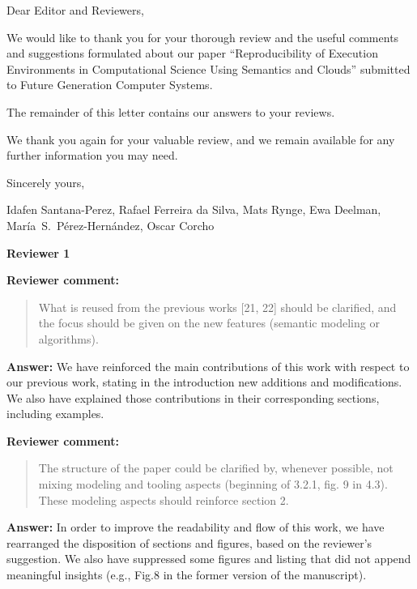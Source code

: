 \documentclass{letter}
\date{Sep 11, 2015}
\newenvironment{review}%
{\textbf{Reviewer comment:}\begin{quote}}%
{\end{quote}}%
\newcommand{\answer}[1]{%
      \textbf{Answer:} #1}
\newcommand{\revised}[1]{\emph{#1}\color{black}}
\begin{document}
\begin{letter}{}

\opening{Dear Editor and Reviewers,}

We would like to thank you for your thorough review and the useful
comments and suggestions formulated about our paper 
``Reproducibility of Execution Environments in Computational Science Using Semantics and Clouds'' 
submitted to Future Generation Computer Systems.

The remainder of this letter contains our answers to your reviews. 

We thank you again for your valuable review, and we remain available for any further information you may need.

\vspace{0.5cm}

Sincerely yours,

\vspace{1cm}

Idafen Santana-Perez, Rafael Ferreira da Silva, Mats Rynge, Ewa Deelman, Mar\'ia~S.~P\'erez-Hern\'andez, Oscar Corcho

\newpage


%
%
\textbf{Reviewer 1}

\begin{review}
What is reused from the previous works [21, 22] should be clarified, and the focus should be given on the new features (semantic modeling or algorithms).
\end{review}

\answer{We have reinforced the main contributions of this work with respect to our previous work, stating in the introduction new additions and modifications. We also have explained those contributions in their corresponding sections, including examples.}



\begin{review}
The structure of the paper could be clarified by, whenever possible, not mixing modeling and tooling aspects (beginning of 3.2.1, fig. 9 in 4.3). These modeling aspects should reinforce section 2.
\end{review}

\answer{In order to improve the readability and flow of this work, we have rearranged the disposition of sections and figures, based on the reviewer's suggestion. We also have suppressed some figures and listing that did not append meaningful insights (e.g., Fig.8 in the former version of the manuscript).}



\end{letter}
\end{document}
